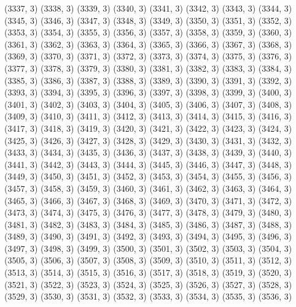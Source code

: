 {   (3337, 3)
   (3338, 3)
   (3339, 3)
   (3340, 3)
   (3341, 3)
   (3342, 3)
   (3343, 3)
   (3344, 3)
   (3345, 3)
   (3346, 3)
   (3347, 3)
   (3348, 3)
   (3349, 3)
   (3350, 3)
   (3351, 3)
   (3352, 3)
   (3353, 3)
   (3354, 3)
   (3355, 3)
   (3356, 3)
   (3357, 3)
   (3358, 3)
   (3359, 3)
   (3360, 3)
   (3361, 3)
   (3362, 3)
   (3363, 3)
   (3364, 3)
   (3365, 3)
   (3366, 3)
   (3367, 3)
   (3368, 3)
   (3369, 3)
   (3370, 3)
   (3371, 3)
   (3372, 3)
   (3373, 3)
   (3374, 3)
   (3375, 3)
   (3376, 3)
   (3377, 3)
   (3378, 3)
   (3379, 3)
   (3380, 3)
   (3381, 3)
   (3382, 3)
   (3383, 3)
   (3384, 3)
   (3385, 3)
   (3386, 3)
   (3387, 3)
   (3388, 3)
   (3389, 3)
   (3390, 3)
   (3391, 3)
   (3392, 3)
   (3393, 3)
   (3394, 3)
   (3395, 3)
   (3396, 3)
   (3397, 3)
   (3398, 3)
   (3399, 3)
   (3400, 3)
   (3401, 3)
   (3402, 3)
   (3403, 3)
   (3404, 3)
   (3405, 3)
   (3406, 3)
   (3407, 3)
   (3408, 3)
   (3409, 3)
   (3410, 3)
   (3411, 3)
   (3412, 3)
   (3413, 3)
   (3414, 3)
   (3415, 3)
   (3416, 3)
   (3417, 3)
   (3418, 3)
   (3419, 3)
   (3420, 3)
   (3421, 3)
   (3422, 3)
   (3423, 3)
   (3424, 3)
   (3425, 3)
   (3426, 3)
   (3427, 3)
   (3428, 3)
   (3429, 3)
   (3430, 3)
   (3431, 3)
   (3432, 3)
   (3433, 3)
   (3434, 3)
   (3435, 3)
   (3436, 3)
   (3437, 3)
   (3438, 3)
   (3439, 3)
   (3440, 3)
   (3441, 3)
   (3442, 3)
   (3443, 3)
   (3444, 3)
   (3445, 3)
   (3446, 3)
   (3447, 3)
   (3448, 3)
   (3449, 3)
   (3450, 3)
   (3451, 3)
   (3452, 3)
   (3453, 3)
   (3454, 3)
   (3455, 3)
   (3456, 3)
   (3457, 3)
   (3458, 3)
   (3459, 3)
   (3460, 3)
   (3461, 3)
   (3462, 3)
   (3463, 3)
   (3464, 3)
   (3465, 3)
   (3466, 3)
   (3467, 3)
   (3468, 3)
   (3469, 3)
   (3470, 3)
   (3471, 3)
   (3472, 3)
   (3473, 3)
   (3474, 3)
   (3475, 3)
   (3476, 3)
   (3477, 3)
   (3478, 3)
   (3479, 3)
   (3480, 3)
   (3481, 3)
   (3482, 3)
   (3483, 3)
   (3484, 3)
   (3485, 3)
   (3486, 3)
   (3487, 3)
   (3488, 3)
   (3489, 3)
   (3490, 3)
   (3491, 3)
   (3492, 3)
   (3493, 3)
   (3494, 3)
   (3495, 3)
   (3496, 3)
   (3497, 3)
   (3498, 3)
   (3499, 3)
   (3500, 3)
   (3501, 3)
   (3502, 3)
   (3503, 3)
   (3504, 3)
   (3505, 3)
   (3506, 3)
   (3507, 3)
   (3508, 3)
   (3509, 3)
   (3510, 3)
   (3511, 3)
   (3512, 3)
   (3513, 3)
   (3514, 3)
   (3515, 3)
   (3516, 3)
   (3517, 3)
   (3518, 3)
   (3519, 3)
   (3520, 3)
   (3521, 3)
   (3522, 3)
   (3523, 3)
   (3524, 3)
   (3525, 3)
   (3526, 3)
   (3527, 3)
   (3528, 3)
   (3529, 3)
   (3530, 3)
   (3531, 3)
   (3532, 3)
   (3533, 3)
   (3534, 3)
   (3535, 3)
   (3536, 3)
}
